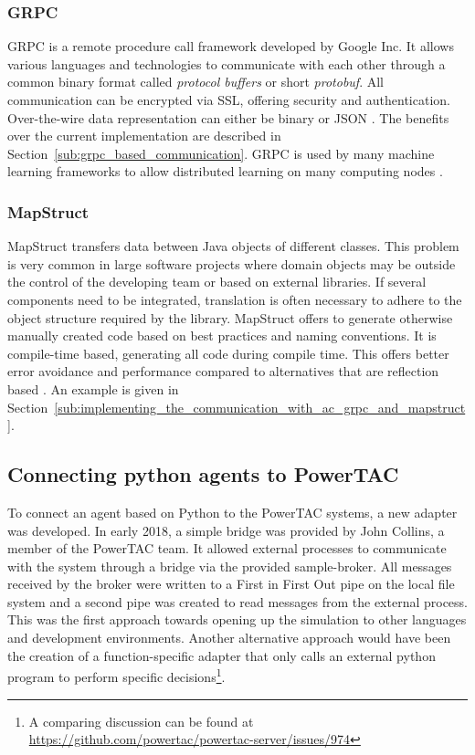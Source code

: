 \subsubsection{\acl{GRPC}}%
\label{sub:grpc}

\acf {GRPC} is a remote procedure call framework developed by Google Inc. It allows various languages and technologies to
communicate with each other through a common binary format called \emph{protocol buffers} or short \emph{protobuf}. All
communication can be encrypted via \ac{SSL}, offering
security and authentication. Over-the-wire data representation can either be binary or \ac{JSON}
\citep[]{grpc}. The benefits over the
current implementation are described in Section~\ref{sub:grpc_based_communication}. \ac{GRPC} is used by many machine learning
frameworks to allow distributed learning on many computing nodes \cite[]{tensorflow2015-whitepaper}.


\subsubsection{MapStruct}%
\label{sub:mapstruct}

MapStruct transfers data between Java objects of different classes. This problem is very common in large
software projects where domain objects may be outside the control of the developing team or based on external libraries.
If several components need to be integrated, translation is often necessary to adhere to the object structure required
by the library. MapStruct offers to generate otherwise manually created code based on best practices and naming
conventions. It is compile-time based, generating all code during compile time. This offers better error avoidance and
performance compared to alternatives that are reflection based
\citep[]{mapstruct}.
An example is given in Section~\ref{sub:implementing_the_communication_with_ac_grpc_and_mapstruct}.





\subsection{Connecting python agents to PowerTAC}%
\label{sec:connecting_python_agents_to_powertac}



To connect an agent based on Python to the \ac{PowerTAC} systems, a new adapter was developed. In early 2018, a simple bridge
was provided by John Collins, a member of the \ac{PowerTAC} team. It allowed external processes to communicate with the
system through a bridge via the provided sample-broker. All messages received by the broker were written to a First in
First Out pipe on the local file system and a second pipe was created to read messages from the external process. This
was the first approach towards opening up the simulation to other languages and development environments. Another
alternative approach would have been the creation of a function-specific adapter that only calls an external python
program to perform specific decisions\footnote{A comparing discussion can be found at
\url{https://github.com/powertac/powertac-server/issues/974}}.

